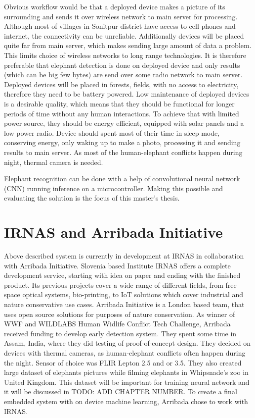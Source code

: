 Obvious workflow would be that a deployed device makes a picture of its surrounding and sends it over wireless network to main server for processing.
Although most of villages in Sonitpur district have access to cell phones and internet, the connectivity can be unreliable\cite{wildlabs-elephants}. 
Additionally devices will be placed quite far from main server, which makes sending large amount of data a problem. 
This limits choice of wireless networks to long range technologies.
It is therefore preferable that elephant detection is done on deployed device and only results (which can be big few bytes) are send over some radio network to main server.
Deployed devices will be placed in forests, fields, with no access to electricity, therefore they need to be battery powered.
Low maintenance of deployed devices is a desirable quality, which means that they should be functional for longer periods of time without any human interactions.
To achieve that with limited power source, they should be energy efficient, equipped with solar panels and a low power radio.
Device should spent most of their time in sleep mode, conserving energy, only waking up to make a photo, processing it and sending results to main server.
As most of the human-elephant conflicts happen during night\cite{wildlabs-elephants}, thermal camera is needed.

Elephant recognition can be done with a help of convolutional neural network (CNN) running inference on a microcontroller. 
Making this possible and evaluating the solution is the focus of this master's thesis.


\section{ IRNAS and Arribada Initiative}

Above described system is currently in development at IRNAS in collaboration with Arribada Initiative.
Slovenia based Institute IRNAS offers a complete development service, starting with idea on paper and ending with the finished product. 
Its previous projects cover a wide range of different fields, from free space optical systems, bio-printing, to IoT solutions which cover industrial and nature conservative use cases.
Arribada Initiative is a London based team, that uses open source solutions for purposes of nature conservation.
As winner of WWF and WILDLABS Human Widlife Conflict Tech Challenge\cite{wildlabs-winners}, Arribada received funding to develop early detection system.
They spent some time in Assam, India, where they did testing of proof-of-concept design\cite{arribada-assam}.
They decided on devices with thermal cameras, as human-elephant conflicts often happen during the night.
Sensor of choice was FLIR Lepton 2.5 and or 3.5.
They also created large dataset of elephants pictures while filming elephants in Whipsnade's zoo in United Kingdom. 
This dataset will be important for training neural network and it will be discussed in TODO: ADD CHAPTER NUMBER.
To create a final embedded system with on device machine learning, Arribada chose to work with IRNAS.


